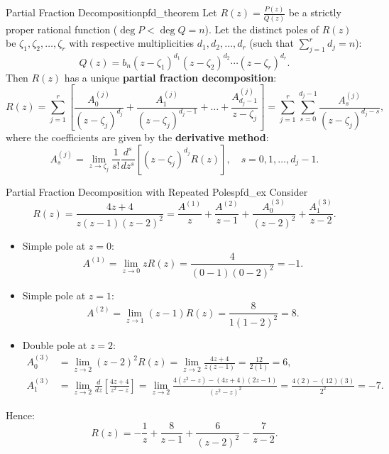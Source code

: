 \begin{theorem}{Partial Fraction Decomposition}{pfd_theorem}
Let $R(z) = \frac{P(z)}{Q(z)}$ be a strictly proper rational function ($\deg P < \deg Q = n$). Let the distinct poles of $R(z)$ be $\zeta_1, \zeta_2, \dots, \zeta_r$ with respective multiplicities $d_1, d_2, \dots, d_r$ (such that $\sum_{j=1}^r d_j = n$):
\begin{equation}
Q(z) = b_n (z - \zeta_1)^{d_1} (z - \zeta_2)^{d_2} \cdots (z - \zeta_r)^{d_r}.
\end{equation}
Then $R(z)$ has a unique \textbf{partial fraction decomposition}:
\begin{equation}
R(z) = \sum_{j=1}^r \left[ \frac{A_0^{(j)}}{(z - \zeta_j)^{d_j}} + \frac{A_1^{(j)}}{(z - \zeta_j)^{d_j - 1}} + \dots + \frac{A_{d_j - 1}^{(j)}}{z - \zeta_j} \right] = \sum_{j=1}^r \sum_{s=0}^{d_j - 1} \frac{A_s^{(j)}}{(z - \zeta_j)^{d_j - s}},
\end{equation}
where the coefficients are given by the \textbf{derivative method}:
\begin{equation}
A_s^{(j)} = \lim_{z \to \zeta_j} \frac{1}{s!} \frac{d^s}{dz^s} \left[ (z - \zeta_j)^{d_j} R(z) \right], \quad s = 0, 1, \dots, d_j - 1.
\end{equation}
\end{theorem}

\begin{example}{Partial Fraction Decomposition with Repeated Poles}{pfd_ex}
Consider
\begin{equation}
R(z) = \frac{4z + 4}{z(z - 1)(z - 2)^2} = \frac{A^{(1)}}{z} + \frac{A^{(2)}}{z - 1} + \frac{A_0^{(3)}}{(z - 2)^2} + \frac{A_1^{(3)}}{z - 2}.
\end{equation}
\begin{itemize}
    \item Simple pole at $z = 0$:
    \begin{equation}
    A^{(1)} = \lim_{z \to 0} z R(z) = \frac{4}{(0 - 1)(0 - 2)^2} = -1.
    \end{equation}
    \item Simple pole at $z = 1$:
    \begin{equation}
    A^{(2)} = \lim_{z \to 1} (z - 1) R(z) = \frac{8}{1(1 - 2)^2} = 8.
    \end{equation}
    \item Double pole at $z = 2$:
    \begin{align}
    A_0^{(3)} &= \lim_{z \to 2} (z - 2)^2 R(z) = \lim_{z \to 2} \frac{4z + 4}{z(z - 1)} = \frac{12}{2(1)} = 6, \\
    A_1^{(3)} &= \lim_{z \to 2} \frac{d}{dz}\left[\frac{4z + 4}{z^2 - z}\right] = \lim_{z \to 2} \frac{4(z^2 - z) - (4z + 4)(2z - 1)}{(z^2 - z)^2} = \frac{4(2) - (12)(3)}{2^2} = -7.
    \end{align}
\end{itemize}
Hence:
\begin{equation}
R(z) = -\frac{1}{z} + \frac{8}{z - 1} + \frac{6}{(z - 2)^2} - \frac{7}{z - 2}.
\end{equation}
\end{example}


